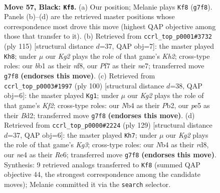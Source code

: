 \documentclass[11pt]{article}
\begin{document}
\clearpage

\begin{figure}[p]\centering
\begin{subfigure}{0.46\textwidth}\centering
\resizebox{\linewidth}{!}{%
\newchessgame
\chessboard[
  setfen={8/2r2pkp/b5p1/4P3/1n2NPp1/8/6KP/1B6 b - - 5 57},
  showmover=false,
  pgfstyle=straightmove, color=movearrow, markmove={g7-f8}
]}
\caption{}
\end{subfigure}\hfill
\begin{subfigure}{0.46\textwidth}\centering
\resizebox{\linewidth}{!}{%
\newchessgame
\chessboard[
  setfen={5N2/1b2N1pk/5p1p/P1n1p3/8/6P1/5P2/6K1 b - - 6 58},
  showmover=false,
  pgfstyle=straightmove, color=movearrow, markmove={h7-h8}
]}
\caption{}
\end{subfigure}
\\[4pt]
\begin{subfigure}{0.46\textwidth}\centering
\resizebox{\linewidth}{!}{%
\newchessgame
\chessboard[
  setfen={8/8/8/1p3p1k/1Pb4p/5P1P/1P1B1KP1/8 w - - 10 51},
  showmover=false,
  pgfstyle=straightmove, color=movearrow, markmove={f2-g1}
]}
\caption{}
\end{subfigure}\hfill
\begin{subfigure}{0.46\textwidth}\centering
\resizebox{\linewidth}{!}{%
\newchessgame
\chessboard[
  setfen={3R4/8/2p1rpk1/2B3p1/7p/1bP4P/5PPK/8 b - - 39 65},
  showmover=false,
  pgfstyle=straightmove, color=movearrow, markmove={g6-h7}
]}
\caption{}
\end{subfigure}
\caption{\textbf{Move 57, Black: \texttt{Kf8}.} (a) Our position; Melanie plays \texttt{Kf8} (\texttt{g7f8}). Panels (b)--(d) are the retrieved master positions whose correspondence most drove this move (highest QAP objective among those that transfer to it). (b) Retrieved from \texttt{ccrl\_top\_p0001\#3732} (ply 115) [structural distance $d$=37, QAP obj=7]: the master played \texttt{Kh8}; under $\mu$ our \emph{Kg2} plays the role of that game's \emph{Kh2}; cross-type roles: our \emph{b}b1 as their \emph{n}f8, our \emph{P}f7 as their \emph{n}e7; transferred move \texttt{g7f8} \textbf{(endorses this move)}. (c) Retrieved from \texttt{ccrl\_top\_p0003\#1997} (ply 100) [structural distance $d$=38, QAP obj=6]: the master played \texttt{Kg1}; under $\mu$ our \emph{Kg2} plays the role of that game's \emph{Kf2}; cross-type roles: our \emph{N}b4 as their \emph{P}b2, our \emph{p}e5 as their \emph{B}d2; transferred move \texttt{g7f8} \textbf{(endorses this move)}. (d) Retrieved from \texttt{ccrl\_top\_p0000\#2224} (ply 129) [structural distance $d$=37, QAP obj=6]: the master played \texttt{Kh7}; under $\mu$ our \emph{Kg2} plays the role of that game's \emph{Kg3}; cross-type roles: our \emph{N}b4 as their \emph{r}d8, our \emph{n}e4 as their \emph{R}e6; transferred move \texttt{g7f8} \textbf{(endorses this move)}. Synthesis: 9 retrieved analogs transferred to \texttt{Kf8} (summed QAP objective 44, the strongest correspondence among the candidate moves); Melanie committed it via the \texttt{search} selector.}
\label{fig:thought-m113}
\end{figure}
\end{document}
